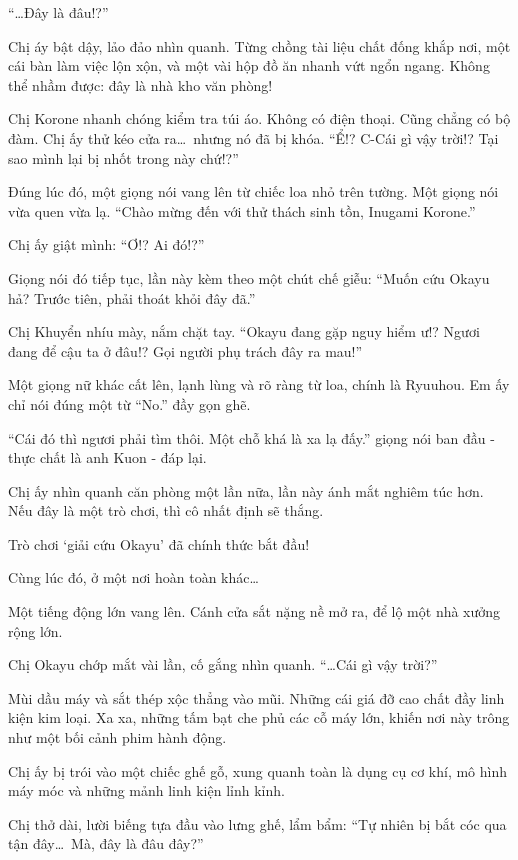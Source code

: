 \documentclass[../main.tex]{subfiles}
\begin{document}
``\dots Đây là đâu!?''

Chị áy bật dậy, lảo đảo nhìn quanh. Từng chồng tài liệu chất đống khắp nơi, một cái bàn làm việc lộn xộn, và một vài hộp đồ ăn nhanh vứt ngổn ngang. Không thể nhầm được: đây là nhà kho văn phòng!

Chị Korone nhanh chóng kiểm tra túi áo. Không có điện thoại. Cũng chẳng có bộ đàm. Chị ấy thử kéo cửa ra\dots\ nhưng nó đã bị khóa. ``Ể!? C-Cái gì vậy trời!? Tại sao mình lại bị nhốt trong này chứ!?''

Đúng lúc đó, một giọng nói vang lên từ chiếc loa nhỏ trên tường. Một giọng nói vừa quen vừa lạ. ``Chào mừng đến với thử thách sinh tồn, Inugami Korone.''

Chị ấy giật mình: ``Ơ!? Ai đó!?''

Giọng nói đó tiếp tục, lần này kèm theo một chút chế giễu: ``Muốn cứu Okayu hả? Trước tiên, phải thoát khỏi đây đã.''

Chị Khuyển nhíu mày, nắm chặt tay. ``Okayu đang gặp nguy hiểm ư!? Ngươi đang để cậu ta ở đâu!? Gọi người phụ trách đây ra mau!''

Một giọng nữ khác cất lên, lạnh lùng và rõ ràng từ loa, chính là Ryuuhou. Em ấy chỉ nói đúng một từ ``No.'' đầy gọn ghẽ.

``Cái đó thì ngươi phải tìm thôi. Một chỗ khá là xa lạ đấy.'' giọng nói ban đầu - thực chất là anh Kuon - đáp lại.

Chị ấy nhìn quanh căn phòng một lần nữa, lần này ánh mắt nghiêm túc hơn. Nếu đây là một trò chơi, thì cô nhất định sẽ thắng.

Trò chơi `giải cứu Okayu' đã chính thức bắt đầu!

\il

Cùng lúc đó, ở một nơi hoàn toàn khác\dots

Một tiếng động lớn vang lên. Cánh cửa sắt nặng nề mở ra, để lộ một nhà xưởng rộng lớn.

Chị Okayu chớp mắt vài lần, cố gắng nhìn quanh. ``\dots Cái gì vậy trời?''

Mùi dầu máy và sắt thép xộc thẳng vào mũi. Những cái giá đỡ cao chất đầy linh kiện kim loại. Xa xa, những tấm bạt che phủ các cỗ máy lớn, khiến nơi này trông như một bối cảnh phim hành động.

Chị ấy bị trói vào một chiếc ghế gỗ, xung quanh toàn là dụng cụ cơ khí, mô hình máy móc và những mảnh linh kiện lỉnh kỉnh.

Chị thở dài, lười biếng tựa đầu vào lưng ghế, lẩm bẩm: ``Tự nhiên bị bắt cóc qua tận đây\dots\ Mà, đây là đâu đây?''
\end{document}
